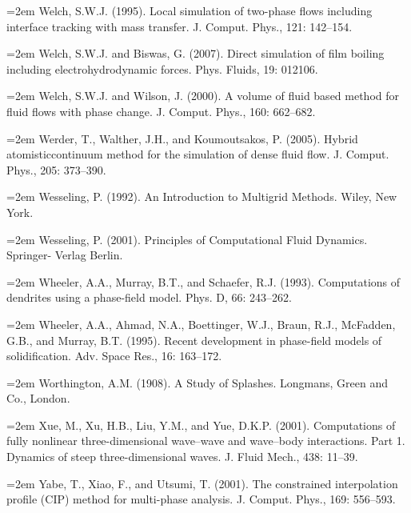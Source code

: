 \documentclass[11pt,a4paper,openany,fontset=none]{ctexbook}
\begin{document}
\par\hangindent=2em Welch, S.W.J. (1995). Local simulation of two-phase flows including interface tracking with mass transfer. J. Comput. Phys., 121: 142--154.

\par\hangindent=2em Welch, S.W.J. and Biswas, G. (2007). Direct simulation of film boiling including electrohydrodynamic forces. Phys. Fluids, 19: 012106.

\par\hangindent=2em Welch, S.W.J. and Wilson, J. (2000). A volume of fluid based method for fluid flows with phase change. J. Comput. Phys., 160: 662--682.

\par\hangindent=2em Werder, T., Walther, J.H., and Koumoutsakos, P. (2005). Hybrid atomisticcontinuum method for the simulation of dense fluid flow. J. Comput. Phys., 205: 373--390.

\par\hangindent=2em Wesseling, P. (1992). An Introduction to Multigrid Methods. Wiley, New York.

\par\hangindent=2em Wesseling, P. (2001). Principles of Computational Fluid Dynamics. Springer- Verlag Berlin.

\par\hangindent=2em Wheeler, A.A., Murray, B.T., and Schaefer, R.J. (1993). Computations of dendrites using a phase-field model. Phys. D, 66: 243--262.

\par\hangindent=2em Wheeler, A.A., Ahmad, N.A., Boettinger, W.J., Braun, R.J., McFadden, G.B., and Murray, B.T. (1995). Recent development in phase-field models of solidification. Adv. Space Res., 16: 163--172.

\par\hangindent=2em Worthington, A.M. (1908). A Study of Splashes. Longmans, Green and Co., London.

\par\hangindent=2em Xue, M., Xu, H.B., Liu, Y.M., and Yue, D.K.P. (2001). Computations of fully nonlinear three-dimensional wave--wave and wave--body interactions. Part 1. Dynamics of steep three-dimensional waves. J. Fluid Mech., 438: 11--39.

\par\hangindent=2em Yabe, T., Xiao, F., and Utsumi, T. (2001). The constrained interpolation profile (CIP) method for multi-phase analysis. J. Comput. Phys., 169: 556--593.
\end{document}
